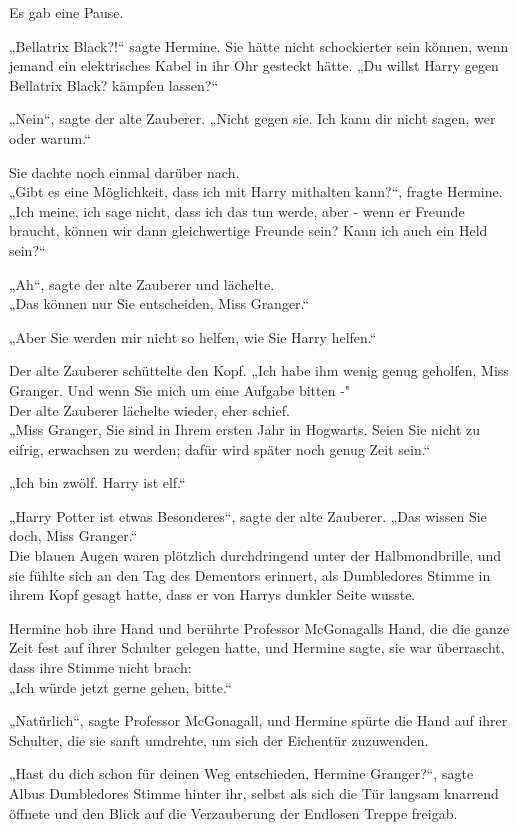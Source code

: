 {Es gab eine Pause.

„Bellatrix Black?!“ sagte Hermine. Sie hätte nicht schockierter sein können, wenn jemand ein elektrisches Kabel in ihr Ohr gesteckt hätte. „Du willst Harry gegen Bellatrix Black? kämpfen lassen?“

„Nein“, sagte der alte Zauberer. „Nicht gegen sie. Ich kann dir nicht sagen, wer oder warum.“

Sie dachte noch einmal darüber nach.\\ „Gibt es eine Möglichkeit, dass ich mit Harry mithalten kann?“, fragte Hermine.\\ „Ich meine, ich sage nicht, dass ich das tun werde, aber - wenn er Freunde braucht, können wir dann gleichwertige Freunde sein? Kann ich auch ein Held sein?“

„Ah“, sagte der alte Zauberer und lächelte.\\ „Das können nur Sie entscheiden, Miss Granger.“

„Aber Sie werden mir nicht so helfen, wie Sie Harry helfen.“

Der alte Zauberer schüttelte den Kopf. „Ich habe ihm wenig genug geholfen, Miss Granger. Und wenn Sie mich um eine Aufgabe bitten -"\\ Der alte Zauberer lächelte wieder, eher schief.\\ „Miss Granger, Sie sind in Ihrem ersten Jahr in Hogwarts. Seien Sie nicht zu eifrig, erwachsen zu werden; dafür wird später noch genug Zeit sein.“

„Ich bin zwölf. Harry ist elf.“

„Harry Potter ist etwas Besonderes“, sagte der alte Zauberer. „Das wissen Sie doch, Miss Granger.“\\ Die blauen Augen waren plötzlich durchdringend unter der Halbmondbrille, und sie fühlte sich an den Tag des Dementors erinnert, als Dumbledores Stimme in ihrem Kopf gesagt hatte, dass er von Harrys dunkler Seite wusste.

Hermine hob ihre Hand und berührte Professor McGonagalls Hand, die die ganze Zeit fest auf ihrer Schulter gelegen hatte, und Hermine sagte, sie war überrascht, dass ihre Stimme nicht brach:\\ „Ich würde jetzt gerne gehen, bitte.“

„Natürlich“, sagte Professor McGonagall, und Hermine spürte die Hand auf ihrer Schulter, die sie sanft umdrehte, um sich der Eichentür zuzuwenden.

„Hast du dich schon für deinen Weg entschieden, Hermine Granger?“, sagte Albus Dumbledores Stimme hinter ihr, selbst als sich die Tür langsam knarrend öffnete und den Blick auf die Verzauberung der Endlosen Treppe freigab.

}
